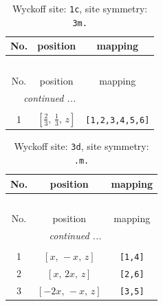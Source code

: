 \documentclass[fleqn,8pt]{jsarticle}
\begin{document}
\begin{longtable}{ccc}
\caption{Wyckoff site: {\tt 1c}, site symmetry: {\tt 3m.}}
 \\
 \hline \hline
No. & position & mapping \\ \hline \endfirsthead

\multicolumn{2}{l}{\tablename\ \thetable{}} \\
 \hline \hline
No. & position & mapping \\ \hline \endhead

 \hline \hline
\multicolumn{2}{r}{\footnotesize\it continued ...} \\ \endfoot

 \hline \hline
\multicolumn{2}{r}{} \\ \endlastfoot

1 & $\left[ \frac{2}{3},\, \frac{1}{3},\, z \right]$ & {\tt [1,2,3,4,5,6]} \\
\end{longtable}
\renewcommand{\arraystretch}{1.2}
\begin{longtable}{ccc}
\caption{Wyckoff site: {\tt 3d}, site symmetry: {\tt .m.}}
 \\
 \hline \hline
No. & position & mapping \\ \hline \endfirsthead

\multicolumn{2}{l}{\tablename\ \thetable{}} \\
 \hline \hline
No. & position & mapping \\ \hline \endhead

 \hline \hline
\multicolumn{2}{r}{\footnotesize\it continued ...} \\ \endfoot

 \hline \hline
\multicolumn{2}{r}{} \\ \endlastfoot

1 & $\left[ x,\, - x,\, z \right]$ & {\tt [1,4]} \\ \hline
2 & $\left[ x,\, 2 x,\, z \right]$ & {\tt [2,6]} \\ \hline
3 & $\left[ - 2 x,\, - x,\, z \right]$ & {\tt [3,5]} \\
\end{longtable}
\renewcommand{\arraystretch}{1.2}
\end{document}
